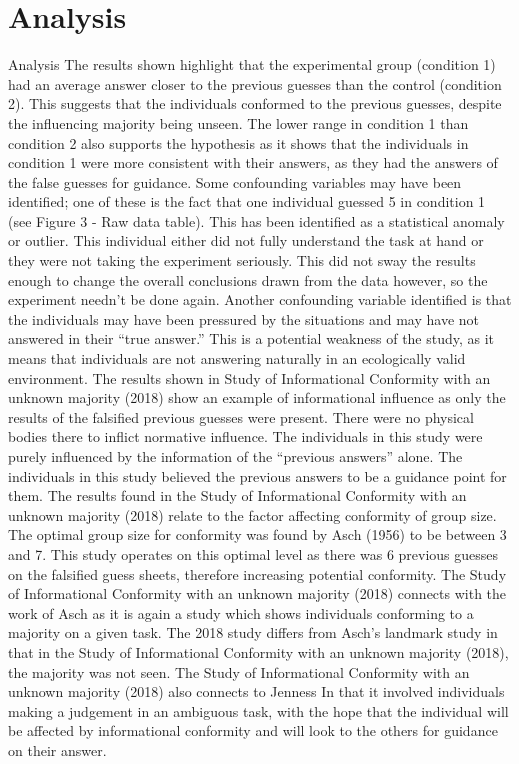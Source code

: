 \documentclass{report}
\begin{document}
\section{Analysis}
Analysis
The results shown highlight that the experimental group (condition 1) had an average answer closer to the previous guesses than the control (condition 2). This suggests that the individuals conformed to the previous guesses, despite the influencing majority being unseen. The lower range in condition 1 than condition 2 also supports the hypothesis as it shows that the individuals in condition 1 were more consistent with their answers, as they had the answers of the false guesses for guidance. Some confounding variables may have been identified; one of these is the fact that one individual guessed 5 in condition 1 (see Figure 3 - Raw data table). This has been identified as a statistical anomaly or outlier. This individual either did not fully understand the task at hand or they were not taking the experiment seriously. This did not sway the results enough to change the overall conclusions drawn from the data however, so the experiment needn’t be done again. Another confounding variable identified is that the individuals may have been pressured by the situations and may have not answered in their “true answer.” This is a potential weakness of the study, as it means that individuals are not answering naturally in an ecologically valid environment. The results shown in Study of Informational Conformity with an unknown majority (2018) show an example of informational influence as only the results of the falsified previous guesses were present. There were no physical bodies there to inflict normative influence. The individuals in this study were purely influenced by the information of the “previous answers” alone. The individuals in this study believed the previous answers to be a guidance point for them. The results found in the Study of Informational Conformity with an unknown majority (2018) relate to the factor affecting conformity of group size. The optimal group size for conformity was found by Asch (1956) to be between 3 and 7. This study operates on this optimal level as there was 6 previous guesses on the falsified guess sheets, therefore increasing potential conformity. The Study of Informational Conformity with an unknown majority (2018) connects with the work of Asch as it is again a study which shows individuals conforming to a majority on a given task. The 2018 study differs from Asch’s landmark study in that in the Study of Informational Conformity with an unknown majority (2018), the majority was not seen. The Study of Informational Conformity with an unknown majority (2018) also connects to Jenness In that it involved individuals making a judgement in an ambiguous task, with the hope that the individual will be affected by informational conformity and will look to the others for guidance on their answer. 
\appendix
\appendixpage
\addappheadtotoc
\end{document}
